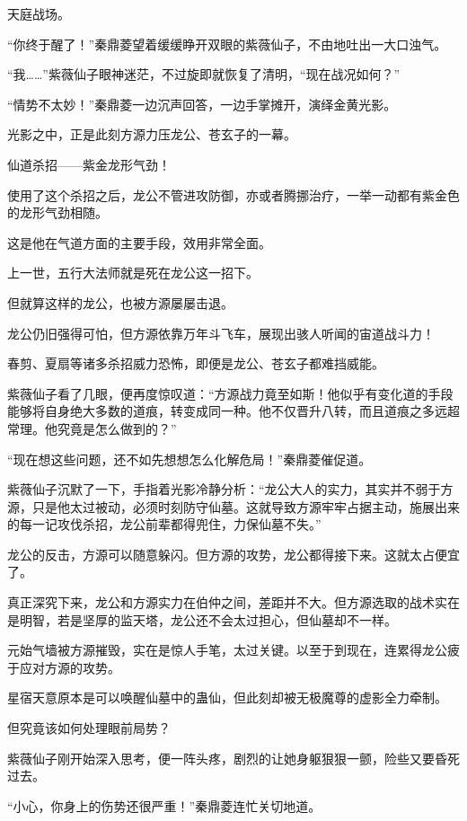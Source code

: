 
\begin{this_body}

天庭战场。

“你终于醒了！”秦鼎菱望着缓缓睁开双眼的紫薇仙子，不由地吐出一大口浊气。

“我……”紫薇仙子眼神迷茫，不过旋即就恢复了清明，“现在战况如何？”

“情势不太妙！”秦鼎菱一边沉声回答，一边手掌摊开，演绎金黄光影。

光影之中，正是此刻方源力压龙公、苍玄子的一幕。

仙道杀招——紫金龙形气劲！

使用了这个杀招之后，龙公不管进攻防御，亦或者腾挪治疗，一举一动都有紫金色的龙形气劲相随。

这是他在气道方面的主要手段，效用非常全面。

上一世，五行大法师就是死在龙公这一招下。

但就算这样的龙公，也被方源屡屡击退。

龙公仍旧强得可怕，但方源依靠万年斗飞车，展现出骇人听闻的宙道战斗力！

春剪、夏扇等诸多杀招威力恐怖，即便是龙公、苍玄子都难挡威能。

紫薇仙子看了几眼，便再度惊叹道：“方源战力竟至如斯！他似乎有变化道的手段能够将自身绝大多数的道痕，转变成同一种。他不仅晋升八转，而且道痕之多远超常理。他究竟是怎么做到的？”

“现在想这些问题，还不如先想想怎么化解危局！”秦鼎菱催促道。

紫薇仙子沉默了一下，手指着光影冷静分析：“龙公大人的实力，其实并不弱于方源，只是他太过被动，必须时刻防守仙墓。这就导致方源牢牢占据主动，施展出来的每一记攻伐杀招，龙公前辈都得兜住，力保仙墓不失。”

龙公的反击，方源可以随意躲闪。但方源的攻势，龙公都得接下来。这就太占便宜了。

真正深究下来，龙公和方源实力在伯仲之间，差距并不大。但方源选取的战术实在是明智，若是坚厚的监天塔，龙公还不会太过担心，但仙墓却不一样。

元始气墙被方源摧毁，实在是惊人手笔，太过关键。以至于到现在，连累得龙公疲于应对方源的攻势。

星宿天意原本是可以唤醒仙墓中的蛊仙，但此刻却被无极魔尊的虚影全力牵制。

但究竟该如何处理眼前局势？

紫薇仙子刚开始深入思考，便一阵头疼，剧烈的让她身躯狠狠一颤，险些又要昏死过去。

“小心，你身上的伤势还很严重！”秦鼎菱连忙关切地道。


\end{this_body}

